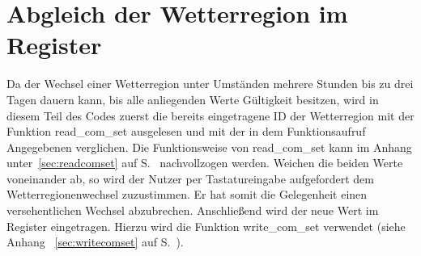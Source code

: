 \section{Abgleich der Wetterregion im Register}
Da der Wechsel einer Wetterregion unter Umständen mehrere Stunden bis zu drei Tagen dauern kann, bis alle anliegenden Werte Gültigkeit besitzen, wird in diesem Teil des Codes zuerst die bereits eingetragene ID der Wetterregion mit der Funktion \textsf{read\_com\_set} ausgelesen und mit der in dem Funktionsaufruf Angegebenen verglichen. Die Funktionsweise von \textsf{read\_com\_set} kann im Anhang unter~\ref{sec:readcomset} auf S.~\pageref{sec:readcomset} nachvollzogen werden. Weichen die beiden Werte voneinander ab, so wird der Nutzer per Tastatureingabe aufgefordert dem Wetterregionenwechsel zuzustimmen. Er hat somit die Gelegenheit einen versehentlichen Wechsel abzubrechen. Anschließend wird der neue Wert im Register eingetragen. Hierzu wird die Funktion \textsf{write\_com\_set} verwendet (siehe Anhang ~\ref{sec:writecomset} auf S.~\pageref{sec:writecomset}). 

